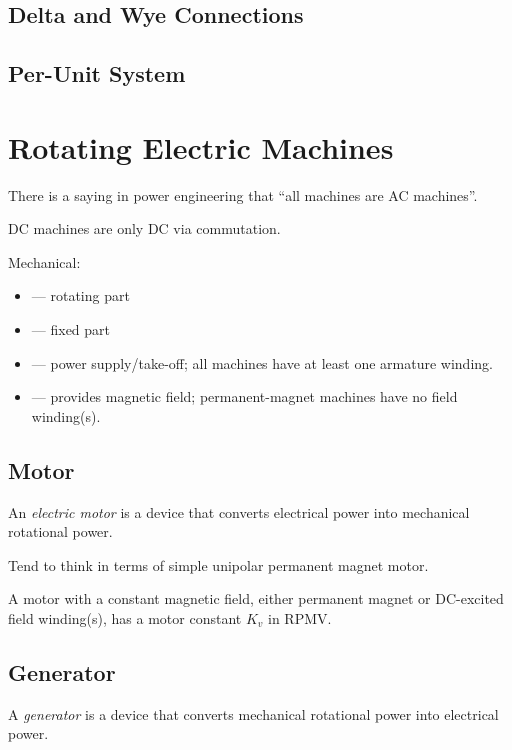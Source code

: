 \documentclass[11pt]{article}
\begin{document}
\subsection{Delta and Wye Connections}

\subsection{Per-Unit System}


\section{Rotating Electric Machines}

There is a saying in power engineering that ``all machines are
AC machines''.

DC machines are only DC via commutation.

Mechanical:
\begin{itemize}
  \item {} --- rotating part
  \item {} --- fixed part
\end{itemize}

\begin{itemize}
  \item {} --- power supply/take-off; all machines have at least one armature winding. 
  \item {} --- provides magnetic field; permanent-magnet machines have no field winding(s).
\end{itemize}


\subsection{Motor}

An \emph{electric motor} is a device that converts electrical power
into mechanical rotational power.

Tend to think in terms of simple unipolar permanent magnet motor.

A motor with a constant magnetic field, either permanent magnet or
DC-excited field winding(s), has a motor constant $K_v$ in
\unit{RPM}{V}.


\subsection{Generator}

A \emph{generator} is a device that converts mechanical rotational
power into electrical power.
\end{document}
